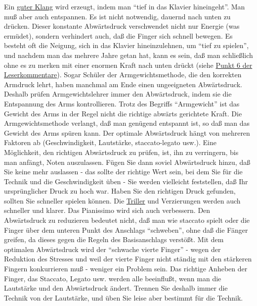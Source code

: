 Ein \hyperlink{c1iii1a}{guter Klang} wird erzeugt, indem man \enquote{tief in das Klavier hineingeht}.
Man muß aber auch entspannen.
Es ist nicht notwendig, dauernd nach unten zu drücken.
Dieser konstante Abwärtsdruck verschwendet nicht nur Energie (was ermüdet), sondern verhindert auch, daß die Finger sich schnell bewegen.
Es besteht oft die Neigung, sich in das Klavier hineinzulehnen, um \enquote{tief zu spielen}, und nachdem man das mehrere Jahre getan hat, kann es sein, daß man schließlich ohne es zu merken mit einer enormen Kraft nach unten drückt (siehe \hyperlink{testimonials06}{Punkt 6 der Leserkommentare}).
Sogar Schüler der Armgewichtsmethode, die den korrekten Armdruck lehrt, haben manchmal am Ende einen ungeeigneten Abwärtsdruck.
Deshalb prüfen Armgewichtslehrer immer den Abwärtsdruck, indem sie die Entspannung des Arms kontrollieren.
Trotz des Begriffs \enquote{Armgewicht} ist das Gewicht des Arms in der Regel nicht die richtige abwärts gerichtete Kraft.
Die Armgewichtsmethode verlangt, daß man genügend entspannt ist, so daß man das Gewicht des Arms spüren kann.
Der optimale Abwärtsdruck hängt von mehreren Faktoren ab (Geschwindigkeit, Lautstärke, staccato-legato usw.).
Eine Möglichkeit, den richtigen Abwärtsdruck zu prüfen, ist, ihn zu verringern, bis man anfängt, Noten auszulassen.
Fügen Sie dann soviel Abwärtsdruck hinzu, daß Sie keine mehr auslassen - das sollte der richtige Wert sein, bei dem Sie für die Technik und die Geschwindigkeit üben - Sie werden vielleicht feststellen, daß Ihr ursprünglicher Druck zu hoch war.
Haben Sie den richtigen Druck gefunden, sollten Sie schneller spielen können.
Die \hyperlink{c1iii3}{Triller} und Verzierungen werden auch schneller und klarer.
Das Pianissimo wird sich auch verbessern.
Den Abwärtsdruck zu reduzieren bedeutet nicht, daß man wie staccato spielt oder die Finger über dem unteren Punkt des Anschlags \enquote{schweben}, ohne daß die Fänger greifen, da dieses gegen die Regeln des Basisanschlags verstößt.
Mit dem optimalen Abwärtsdruck wird der \enquote{schwache vierte Finger} - wegen der Reduktion des Stresses und weil der vierte Finger nicht ständig mit den stärkeren Fingern konkurrieren muß - weniger ein Problem sein.
Das richtige Anheben der Finger, das Staccato, Legato usw. werden alle beeinflußt, wenn man die Lautstärke und den Abwärtsdruck ändert.
Trennen Sie deshalb immer die Technik von der Lautstärke, und üben Sie leise aber bestimmt für die Technik.

